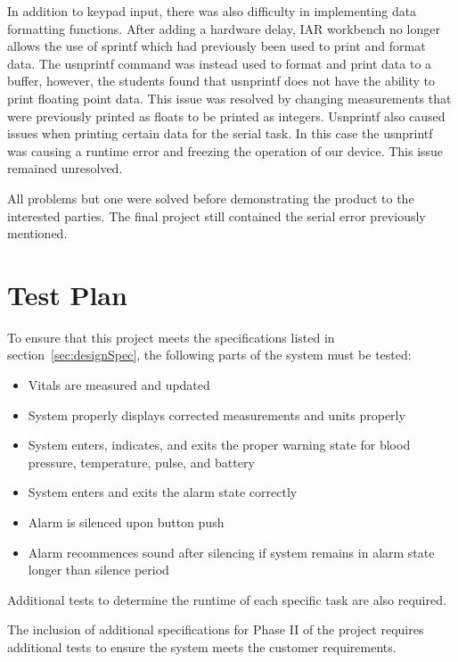 \documentclass[12pt]{article} %
\begin{document}
    In addition to keypad input, there was also difficulty in implementing data
    formatting functions. After adding a hardware delay, IAR workbench no
    longer allows the use of sprintf which had previously been used to print
    and format data. The usnprintf command was instead used to format and print
    data to a buffer, however, the students found that usnprintf does not have
    the ability to print floating point data. This issue was resolved by
    changing measurements that were previously printed as floats to be printed
    as integers. Usnprintf also caused issues when printing certain data for
    the serial task. In this case the usnprintf was causing a runtime error and
    freezing the operation of our device. This issue remained unresolved. 
    
    
    
    
    All problems but one were solved before demonstrating the product to the interested
    parties. The final project still contained the serial error previously mentioned.
    
    \section{Test Plan} 

    To ensure that this project meets the specifications listed in 
    section~\ref{sec:designSpec}, the following parts of the system must be 
    tested: 

    \begin{itemize}
      \item Vitals are measured and updated
      \item System properly displays corrected measurements and units properly
      \item System enters, indicates, and exits the proper warning state for
	blood pressure, temperature, pulse, and battery
      \item System enters and exits the alarm state correctly
      \item Alarm is silenced upon button push
      \item Alarm recommences sound after silencing if system remains in alarm
	state longer than silence period
    \end{itemize}

    Additional tests to determine the runtime of each specific task are also
    required.

    The inclusion of additional specifications for Phase II of the project
    requires additional tests to ensure the system meets the customer
    requirements.
\end{document}

